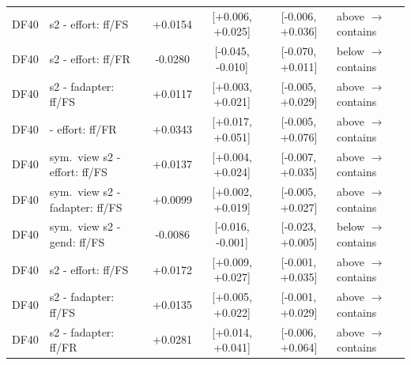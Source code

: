 \begin{tabular}{@{}l l c c c l@{}}
DF40 & \oursF{} s2 - effort: ff/FS & +0.0154 & [+0.006, +0.025] & [-0.006, +0.036] & above $\rightarrow$ contains \\
DF40 & \oursF{} s2 - effort: ff/FR & -0.0280 & [-0.045, -0.010] & [-0.070, +0.011] & below $\rightarrow$ contains \\
DF40 & \oursF{} s2 - fadapter: ff/FS & +0.0117 & [+0.003, +0.021] & [-0.005, +0.029] & above $\rightarrow$ contains \\
DF40 & \oursB{} - effort: ff/FR & +0.0343 & [+0.017, +0.051] & [-0.005, +0.076] & above $\rightarrow$ contains \\
DF40 & sym.\ view s2 - effort: ff/FS & +0.0137 & [+0.004, +0.024] & [-0.007, +0.035] & above $\rightarrow$ contains \\
DF40 & sym.\ view s2 - fadapter: ff/FS & +0.0099 & [+0.002, +0.019] & [-0.005, +0.027] & above $\rightarrow$ contains \\
DF40 & sym.\ view s2 - gend: ff/FS & -0.0086 & [-0.016, -0.001] & [-0.023, +0.005] & below $\rightarrow$ contains \\
DF40 & \oursB{} s2 - effort: ff/FS & +0.0172 & [+0.009, +0.027] & [-0.001, +0.035] & above $\rightarrow$ contains \\
DF40 & \oursB{} s2 - fadapter: ff/FS & +0.0135 & [+0.005, +0.022] & [-0.001, +0.029] & above $\rightarrow$ contains \\
DF40 & \oursB{} s2 - fadapter: ff/FR & +0.0281 & [+0.014, +0.041] & [-0.006, +0.064] & above $\rightarrow$ contains \\
\bottomrule
\end{tabular}
